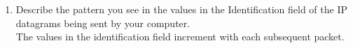 \begin{enumerate}[label=\bfseries Problem \arabic*:,leftmargin=*,labelindent=1em]
        \item Describe the pattern you see in the values in the Identification field of the IP datagrams being sent by your computer.\\[0.2mm]
        \soln The values in the identification field increment with each subsequent packet.
\end{enumerate}
\newpage